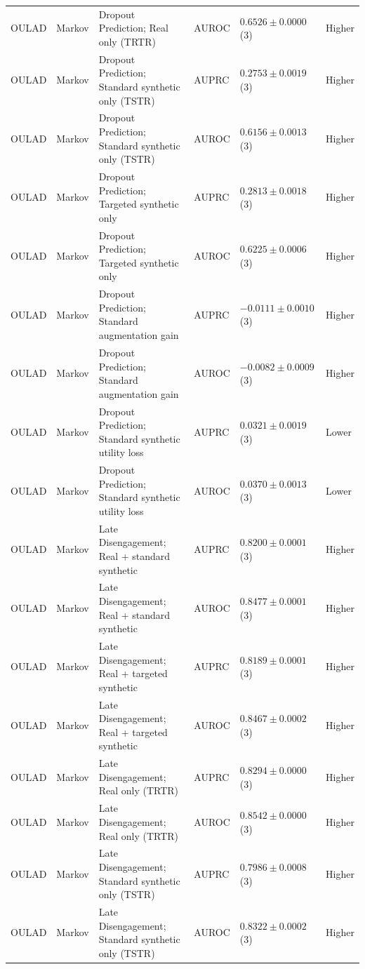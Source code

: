 \begin{longtable}{@{}p{2.25cm}p{2.05cm}p{4.7cm}p{5.0cm}p{2.6cm}p{1.25cm}@{}}
OULAD & Markov & Dropout Prediction; Real only (TRTR) & AUROC & $0.6526 \mathbin{\pm} 0.0000$ (3) & Higher \\
OULAD & Markov & Dropout Prediction; Standard synthetic only (TSTR) & AUPRC & $0.2753 \mathbin{\pm} 0.0019$ (3) & Higher \\
OULAD & Markov & Dropout Prediction; Standard synthetic only (TSTR) & AUROC & $0.6156 \mathbin{\pm} 0.0013$ (3) & Higher \\
OULAD & Markov & Dropout Prediction; Targeted synthetic only & AUPRC & $0.2813 \mathbin{\pm} 0.0018$ (3) & Higher \\
OULAD & Markov & Dropout Prediction; Targeted synthetic only & AUROC & $0.6225 \mathbin{\pm} 0.0006$ (3) & Higher \\
OULAD & Markov & Dropout Prediction; Standard augmentation gain & AUPRC & $-0.0111 \mathbin{\pm} 0.0010$ (3) & Higher \\
OULAD & Markov & Dropout Prediction; Standard augmentation gain & AUROC & $-0.0082 \mathbin{\pm} 0.0009$ (3) & Higher \\
OULAD & Markov & Dropout Prediction; Standard synthetic utility loss & AUPRC & $0.0321 \mathbin{\pm} 0.0019$ (3) & Lower \\
OULAD & Markov & Dropout Prediction; Standard synthetic utility loss & AUROC & $0.0370 \mathbin{\pm} 0.0013$ (3) & Lower \\
OULAD & Markov & Late Disengagement; Real + standard synthetic & AUPRC & $0.8200 \mathbin{\pm} 0.0001$ (3) & Higher \\
OULAD & Markov & Late Disengagement; Real + standard synthetic & AUROC & $0.8477 \mathbin{\pm} 0.0001$ (3) & Higher \\
OULAD & Markov & Late Disengagement; Real + targeted synthetic & AUPRC & $0.8189 \mathbin{\pm} 0.0001$ (3) & Higher \\
OULAD & Markov & Late Disengagement; Real + targeted synthetic & AUROC & $0.8467 \mathbin{\pm} 0.0002$ (3) & Higher \\
OULAD & Markov & Late Disengagement; Real only (TRTR) & AUPRC & $0.8294 \mathbin{\pm} 0.0000$ (3) & Higher \\
OULAD & Markov & Late Disengagement; Real only (TRTR) & AUROC & $0.8542 \mathbin{\pm} 0.0000$ (3) & Higher \\
OULAD & Markov & Late Disengagement; Standard synthetic only (TSTR) & AUPRC & $0.7986 \mathbin{\pm} 0.0008$ (3) & Higher \\
OULAD & Markov & Late Disengagement; Standard synthetic only (TSTR) & AUROC & $0.8322 \mathbin{\pm} 0.0002$ (3) & Higher \\

\end{longtable}
